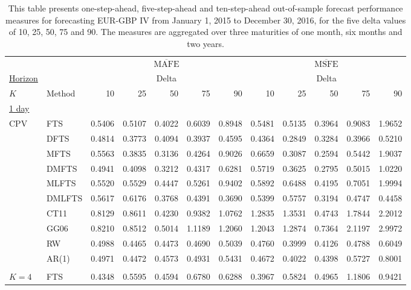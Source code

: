 \documentclass[12pt,a4paper]{article}
\begin{document}
\begin{center}
\tabcolsep 0.08in
\renewcommand{\arraystretch}{0.95}
\begin{small}
\begin{longtable}{@{}llrrrrrrrrrr@{}}
\caption{\small{This table presents one-step-ahead, five-step-ahead and ten-step-ahead out-of-sample forecast performance measures for forecasting EUR-GBP IV from January 1, 2015 to December 30, 2016, for the five delta values of 10, 25, 50, 75 and 90. The measures are aggregated over three maturities of one month, six months and two years.}}\label{tab:5_moneyness} \\
\toprule
& & \multicolumn{5}{c}{$\overline{\text{MAFE}}$} & \multicolumn{5}{c}{$\overline{\text{MSFE}}$} \\
\underline{Horizon} & & \multicolumn{5}{c}{Delta} & \multicolumn{5}{c}{Delta} \\
$K$ & Method & 10 & 25 & 50 & 75 & 90 & 10 & 25 & 50 & 75 & 90 \\ 
\endfirsthead
\midrule
\underline{1 day} \\
CPV &  FTS & 0.5406 & 0.5107 & 0.4022 & 0.6039 & 0.8948 & 0.5481 & 0.5135 & 0.3964 & 0.9083 & 1.9652 \\ 
&  DFTS & 0.4814 & 0.3773 & 0.4094 & 0.3937 & 0.4595 & 0.4364 & 0.2849 & 0.3284 & 0.3966 & 0.5210 \\ 
&  MFTS & 0.5563 & 0.3835 & 0.3136 & 0.4264 & 0.9026 & 0.6659 & 0.3087 & 0.2594 & 0.5442 & 1.9037 \\ 
&  DMFTS & 0.4941 & 0.4098 & 0.3212 & 0.4317 & 0.6281 & 0.5719 & 0.3625 & 0.2795 & 0.5015 & 1.0220 \\ 
&  MLFTS & 0.5520 & 0.5529 & 0.4447 & 0.5261 & 0.9402 & 0.5892 & 0.6488 & 0.4195 & 0.7051 & 1.9994 \\ 
&  DMLFTS & 0.5617 & 0.6176 & 0.3768 & 0.4391 & 0.3690 & 0.5399 & 0.5757 & 0.3194 & 0.4747 & 0.4458 \\ 
& CT11 & 0.8129 & 0.8611 & 0.4230 & 0.9382 & 1.0762 & 1.2835 & 1.3531 & 0.4743 & 1.7844 & 2.2012 \\ 
& GG06 & 0.8210 & 0.8512 & 0.5014 & 1.1189 & 1.2060 & 1.2043 & 1.2874 & 0.7364 & 2.1197 & 2.9972 \\ 
 & RW & 0.4988 & 0.4465 & 0.4473 & 0.4690 & 0.5039 & 0.4760 & 0.3999 & 0.4126 & 0.4788 & 0.6049 \\ 
 & AR(1) & 0.4971 & 0.4472 & 0.4573 & 0.4931 & 0.5431 & 0.4672 & 0.4022 & 0.4398 & 0.5727 & 0.8001 \\ 
\\
$K=4$ & FTS  & 0.4348 & 0.5595 & 0.4594 & 0.6780 & 0.6288 & 0.3967 & 0.5824 & 0.4965 & 1.1806 & 0.9421 \\ 

\end{longtable}
\end{small}
\end{center}
\end{document}
